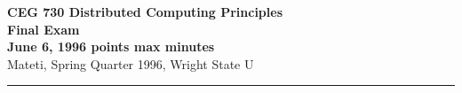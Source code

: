 \def\fat{\framebox[1mm]{\rule{0mm}{2mm}}}
\def\CSP{{\sc csp}}
\def\RPC{{\sc rpc}}
\def\SR{{\sc sr}}
\def\co{{\bf co}}
\def\oc{{\bf oc}}
\def\zand{\wedge}\def\zor{\vee}	\def\znot{\neg}
\def\ellipsis{\ldots}
\def\pbar{\parallel}
\def\lb{\langle}
\def\rb{\rangle}
\def\ra{\rightarrow}
\def\await{{\bf await}}
\parindent=0pt
\pagestyle{empty}



{\bf CEG 
\large \bf 730 Distributed Computing Principles\\[5pt]
\large Final Exam\\[10pt]
June 6, 1996  points max  minutes\\
}
\bigskip
{Mateti,  Spring Quarter 1996, Wright State U}\\[-5pt]
\hrule

